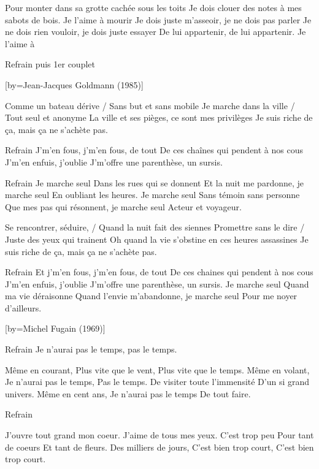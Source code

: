 \beginverse
Pour monter dans sa grotte cachée sous les toits
Je dois clouer des notes à mes sabots de bois. Je l'aime à mourir
Je dois juste m'asseoir, je ne dois pas parler
Je ne dois rien vouloir, je dois juste essayer
De lui appartenir, de lui appartenir. Je l'aime à
\endverse

\beginverse
Refrain puis 1er couplet
\endverse

[by={Jean-Jacques Goldmann (1985)}]

\beginverse
Comme un bateau dérive / Sans but et sans mobile
Je marche dans la ville / Tout seul et anonyme
La ville et ses pièges, ce sont mes privilèges
Je suis riche de ça, mais ça ne s'achète pas.
\endverse

\beginverse
Refrain
J'm'en fous, j'm'en fous, de tout
De ces chaînes qui pendent à nos cous
J'm'en enfuis, j'oublie
J'm'offre une parenthèse, un sursis.
\endverse

\beginverse
Refrain
Je marche seul
Dans les rues qui se donnent
Et la nuit me pardonne, je marche seul
En oubliant les heures.
Je marche seul
Sans témoin sans personne
Que mes pas qui résonnent, je marche seul
Acteur et voyageur.
\endverse

\beginverse
Se rencontrer, séduire, / Quand la nuit fait des siennes
Promettre sans le dire / Juste des yeux qui trainent
Oh quand la vie s'obstine en ces heures assassines
Je suis riche de ça, mais ça ne s'achète pas.
\endverse

\beginverse
Refrain
Et j'm'en fous, j'm'en fous, de tout
De ces chaines qui pendent à nos cous
J'm'en enfuis, j'oublie
J'm'offre une parenthèse, un sursis.
Je marche seul
Quand ma vie déraisonne
Quand l'envie m'abandonne, je marche seul
Pour me noyer d'ailleurs.
\endverse

[by={Michel Fugain (1969)}]

\beginverse
Refrain
Je n'aurai pas le temps, 
pas le temps.
\endverse

\beginverse
Même en courant,
Plus vite que le vent,
Plus vite que le temps.
Même en volant,
Je n'aurai pas le temps,
Pas le temps.
De visiter toute l'immensité
D'un si grand univers.
Même en cent ans,
Je n'aurai pas le temps
De tout faire.
\endverse

\beginverse
Refrain
\endverse

\beginverse
J'ouvre tout grand mon coeur.
J'aime de tous mes yeux.
C'est trop peu
Pour tant de coeurs
Et tant de fleurs.
Des milliers de jours,
C'est bien trop court,
C'est bien trop court.
\endverse

